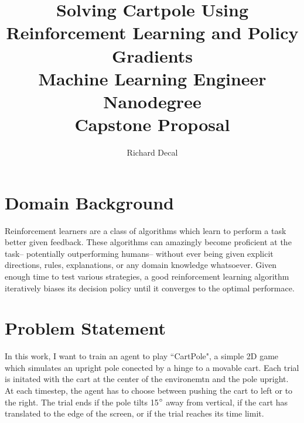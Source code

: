 \documentclass[12pt,a4paper]{article}
\author{Richard Decal}
\title{%
  Solving Cartpole Using Reinforcement Learning and Policy Gradients \\
  \large Machine Learning Engineer Nanodegree\\
  Capstone Proposal}
\begin{document}
\maketitle




\section*{Domain Background}


Reinforcement learners are a class of algorithms which learn to perform a task better given feedback. These algorithms can amazingly become proficient at the task-- potentially outperforming humans-- without ever being given explicit directions, rules, explanations, or any domain knowledge whatsoever. Given enough time to test various strategies, a good reinforcement learning algorithm iteratively biases its decision policy until it converges to the optimal performace.


\section*{Problem Statement}
%

In this work, I want to train an agent to play ``CartPole", a simple 2D game which simulates an upright pole conected by a hinge to a movable cart.\cite{cartpole} Each trial is initated with the cart at the center of the environemtn and the pole upright. At each timestep, the agent has to choose between pushing the cart to left or to the right. The trial ends if the pole tilts 15$\degree$ away from vertical, if the cart has translated to the edge of the screen, or if the trial reaches its time limit.
\end{document}
